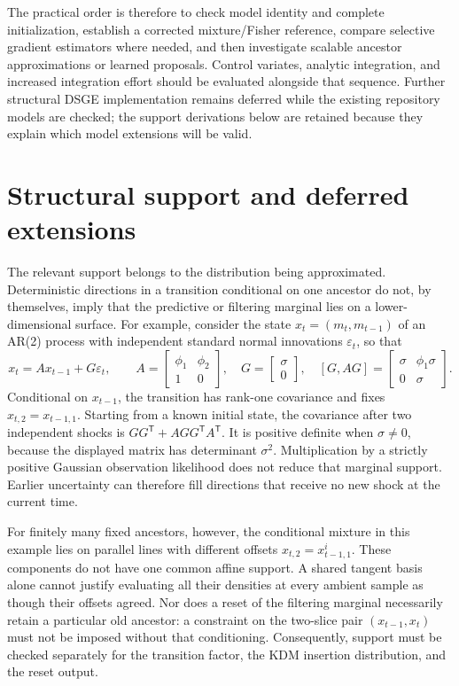\documentclass[11pt]{article}
\begin{document}
The practical order is therefore to check model identity and complete
initialization, establish a corrected mixture/Fisher reference, compare
selective gradient estimators where needed, and then investigate scalable
ancestor approximations or learned proposals. Control variates, analytic
integration, and increased integration effort should be evaluated alongside
that sequence. Further structural DSGE implementation remains deferred while
the existing repository models are checked; the support derivations below
are retained because they explain which model extensions will be valid.


\section{Structural support and deferred extensions}
\label{sec:support}

The relevant support belongs to the distribution being approximated.
Deterministic directions in a transition conditional on one ancestor do not,
by themselves, imply that the predictive or filtering marginal lies on a
lower-dimensional surface.  For example, consider the state
$x_t=(m_t,m_{t-1})$ of an AR(2) process with independent standard normal
innovations $\varepsilon_t$, so that
\begin{equation}
 x_t=A x_{t-1}+G\varepsilon_t,\qquad
 A=\begin{bmatrix}\phi_1&\phi_2\\1&0\end{bmatrix},\quad
 G=\begin{bmatrix}\sigma\\0\end{bmatrix},\quad
 [G,AG]=\begin{bmatrix}\sigma&\phi_1\sigma\\0&\sigma\end{bmatrix}.
 \label{eq:ar2-support-distinction}
\end{equation}
Conditional on $x_{t-1}$, the transition has rank-one covariance and fixes
$x_{t,2}=x_{t-1,1}$.  Starting from a known initial state, the covariance
after two independent shocks is $GG^\mathsf{T}+AGG^\mathsf{T}A^\mathsf{T}$.
It is positive definite when $\sigma\ne0$, because the displayed matrix has
determinant $\sigma^2$.  Multiplication by a strictly positive Gaussian
observation likelihood does not reduce that marginal support.  Earlier
uncertainty can therefore fill directions that receive no new shock at the
current time.

For finitely many fixed ancestors, however, the conditional mixture in this
example lies on parallel lines with different offsets $x_{t,2}=x_{t-1,1}^i$.
These components do not have one common affine support.  A shared tangent
basis alone cannot justify evaluating all their densities at every ambient
sample as though their offsets agreed.  Nor does a reset of the filtering
marginal necessarily retain a particular old ancestor: a constraint on the
two-slice pair $(x_{t-1},x_t)$ must not be imposed without that conditioning.
Consequently, support must be checked separately for the transition factor,
the KDM insertion distribution, and the reset output.
\end{document}
